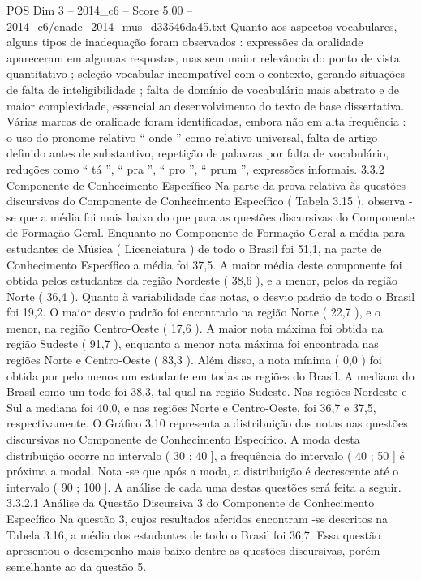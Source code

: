 \begin{textsample}{POS Dim 3 – 2014\_c6 – Score 5.00 – 2014\_c6/enade\_2014\_mus\_d33546da45.txt}
Quanto aos aspectos vocabulares, alguns tipos de inadequação foram observados : expressões da oralidade apareceram em algumas respostas, mas sem maior relevância do ponto de vista quantitativo ; seleção vocabular incompatível com o contexto, gerando situações de falta de inteligibilidade ; falta de domínio de vocabulário mais abstrato e de maior complexidade, essencial ao desenvolvimento do texto de base dissertativa.
Várias marcas de oralidade foram identificadas, embora não em alta frequência : o uso do pronome relativo “ onde ” como relativo universal, falta de artigo definido antes de substantivo, repetição de palavras por falta de vocabulário, reduções como “ tá ”, “ pra ”, “ pro ”, “ prum ”, expressões informais. 3.3.2 Componente de Conhecimento Específico Na parte da prova relativa às questões discursivas do Componente de Conhecimento Específico ( Tabela 3.15 ), observa -se que a média foi mais baixa do que para as questões discursivas do Componente de Formação Geral.
Enquanto no Componente de Formação Geral a média para estudantes de Música ( Licenciatura ) de todo o Brasil foi 51,1, na parte de Conhecimento Específico a média foi 37,5.
A maior média deste componente foi obtida pelos estudantes da região Nordeste ( 38,6 ), e a menor, pelos da região Norte ( 36,4 ).
Quanto à variabilidade das notas, o desvio padrão de todo o Brasil foi 19,2.
O maior desvio padrão foi encontrado na região Norte ( 22,7 ), e o menor, na região Centro-Oeste ( 17,6 ).
A maior nota máxima foi obtida na região Sudeste ( 91,7 ), enquanto a menor nota máxima foi encontrada nas regiões Norte e Centro-Oeste ( 83,3 ).
Além disso, a nota mínima ( 0,0 ) foi obtida por pelo menos um estudante em todas as regiões do Brasil.
A mediana do Brasil como um todo foi 38,3, tal qual na região Sudeste.
Nas regiões Nordeste e Sul a mediana foi 40,0, e nas regiões Norte e Centro-Oeste, foi 36,7 e 37,5, respectivamente.
O Gráfico 3.10 representa a distribuição das notas nas questões discursivas no Componente de Conhecimento Específico.
A moda desta distribuição ocorre no intervalo ( 30 ; 40 ], a frequência do intervalo ( 40 ; 50 ] é próxima a modal.
Nota -se que após a moda, a distribuição é decrescente até o intervalo ( 90 ; 100 ].
A análise de cada uma destas questões será feita a seguir. 3.3.2.1 Análise da Questão Discursiva 3 do Componente de Conhecimento Específico Na questão 3, cujos resultados aferidos encontram -se descritos na Tabela 3.16, a média dos estudantes de todo o Brasil foi 36,7.
Essa questão apresentou o desempenho mais baixo dentre as questões discursivas, porém semelhante ao da questão 5.

\end{textsample}
